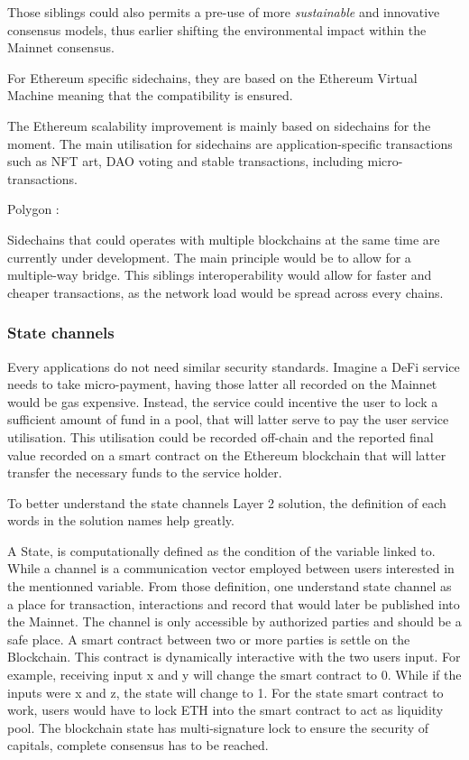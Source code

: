 Those siblings could also permits a pre-use of more \textit{sustainable} and innovative consensus models, thus earlier shifting the environmental impact within the Mainnet consensus.

For Ethereum specific sidechains, they are based on the Ethereum Virtual Machine meaning that the compatibility is ensured.


The Ethereum scalability improvement is mainly based on sidechains for the moment. The main utilisation for sidechains are application-specific transactions such as NFT art, DAO voting and stable transactions, including micro-transactions.

Polygon : 

Sidechains that could operates with multiple blockchains at the same time are currently under development. The main principle would be to allow for a multiple-way bridge. This siblings interoperability would allow for faster and cheaper transactions, as the network load would be spread across every chains.


\subsubsection{State channels}
Every applications do not need similar security standards. Imagine a DeFi service needs to take micro-payment, having those latter all recorded on the Mainnet would be gas expensive. Instead, the service could incentive the user to lock a sufficient amount of fund in a pool, that will latter serve to pay the user service utilisation. This utilisation could be recorded off-chain and the reported final value recorded on a smart contract on the Ethereum blockchain that will latter transfer the necessary funds to the service holder.

To better understand the state channels Layer 2 solution, the definition of each words in the solution names help greatly.

A State, is computationally defined as the condition of the variable linked to. While a channel is a communication vector employed between users interested in the mentionned variable. From those definition, one understand state channel as a place for transaction, interactions and record that would later be published into the Mainnet. The channel is only accessible by authorized parties and should be a safe place.
A smart contract between two or more parties is settle on the Blockchain. This contract is dynamically interactive with the two users input. For example, receiving input x and y will change the smart contract to 0. While if the inputs were x and z, the state will change to 1. For the state smart contract to work, users would have to lock ETH into the smart contract to act as liquidity pool. The blockchain state has multi-signature lock to ensure the security of capitals, complete consensus has to be reached.

